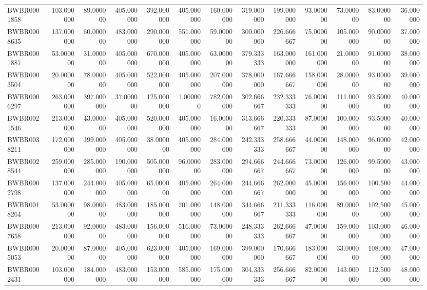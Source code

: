 \begin{longtable}{lrrrrrrrrrrrr}
BWBR0001858 & 103.000000 & 89.000000 & 405.000000 & 392.000000 & 405.000000 & 160.000000 & 319.000000 & 199.000000 & 93.000000 & 73.000000 & 83.000000 & 36.000000 \\
BWBR0008635 & 137.000000 & 60.000000 & 483.000000 & 290.000000 & 551.000000 & 59.000000 & 300.000000 & 226.666667 & 75.000000 & 105.000000 & 90.000000 & 37.000000 \\
BWBR0001887 & 53.000000 & 31.000000 & 405.000000 & 670.000000 & 405.000000 & 63.000000 & 379.333333 & 163.000000 & 161.000000 & 21.000000 & 91.000000 & 38.000000 \\
BWBR0003504 & 20.000000 & 78.000000 & 405.000000 & 522.000000 & 405.000000 & 207.000000 & 378.000000 & 167.666667 & 158.000000 & 28.000000 & 93.000000 & 39.000000 \\
BWBR0006297 & 263.000000 & 397.000000 & 37.000000 & 125.000000 & 1.000000 & 782.000000 & 302.666667 & 232.333333 & 76.000000 & 111.000000 & 93.500000 & 40.000000 \\
BWBR0021546 & 213.000000 & 43.000000 & 405.000000 & 520.000000 & 405.000000 & 16.000000 & 313.666667 & 220.333333 & 87.000000 & 100.000000 & 93.500000 & 40.000000 \\
BWBR0038211 & 172.000000 & 199.000000 & 405.000000 & 38.000000 & 405.000000 & 284.000000 & 242.333333 & 258.666667 & 44.000000 & 148.000000 & 96.000000 & 42.000000 \\
BWBR0028544 & 259.000000 & 285.000000 & 190.000000 & 505.000000 & 96.000000 & 283.000000 & 294.666667 & 244.666667 & 73.000000 & 126.000000 & 99.500000 & 43.000000 \\
BWBR0002798 & 137.000000 & 244.000000 & 405.000000 & 65.000000 & 405.000000 & 264.000000 & 244.666667 & 262.000000 & 45.000000 & 156.000000 & 100.500000 & 44.000000 \\
BWBR0018264 & 53.000000 & 98.000000 & 483.000000 & 185.000000 & 701.000000 & 148.000000 & 344.666667 & 211.333333 & 116.000000 & 89.000000 & 102.500000 & 45.000000 \\
BWBR0007658 & 213.000000 & 92.000000 & 483.000000 & 156.000000 & 516.000000 & 73.000000 & 248.333333 & 262.666667 & 47.000000 & 159.000000 & 103.000000 & 46.000000 \\
BWBR0005053 & 20.000000 & 87.000000 & 405.000000 & 623.000000 & 405.000000 & 169.000000 & 399.000000 & 170.666667 & 183.000000 & 33.000000 & 108.000000 & 47.000000 \\
BWBR0002431 & 103.000000 & 184.000000 & 483.000000 & 153.000000 & 585.000000 & 175.000000 & 304.333333 & 256.666667 & 82.000000 & 143.000000 & 112.500000 & 48.000000 \\

\end{longtable}
